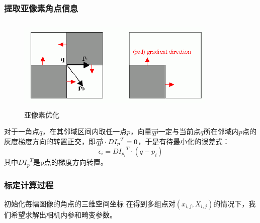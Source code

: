 \documentclass[10pt,a4paper]{article}
\begin{document}
\begin{CJK*}{UTF8}{gbsn}
\subsubsection{提取亚像素角点信息}
\begin{figure}[htbp]
    \centering
    \includegraphics[height=4.5cm,width=9.5cm]{cornersubpix.png}
    \caption{亚像素优化}
\end{figure}
对于一角点$q$，在其邻域区间内取任一点$p$，向量$\overrightarrow {qp} $一定与当前点$q$所在邻域内$p$点的灰度梯度方向的转置正交，即$\overrightarrow {qp} {\rm{ }} \cdot {\rm{ }}D{I_p}^T = 0$，于是有待最小化的误差式：
\begin{equation}
    \epsilon _i = {DI_{p_i}}^T \cdot (q - p_i)
\end{equation}
其中${DI_p}^T$是p点的梯度方向转置。
\subsubsection{标定计算过程}
初始化每幅图像的角点的三维空间坐标
在得到多组点对$(x_{i,j},X_{i,j})$的情况下，我们希望求解出相机内参和畸变参数。


\end{CJK*}
\end{document}
